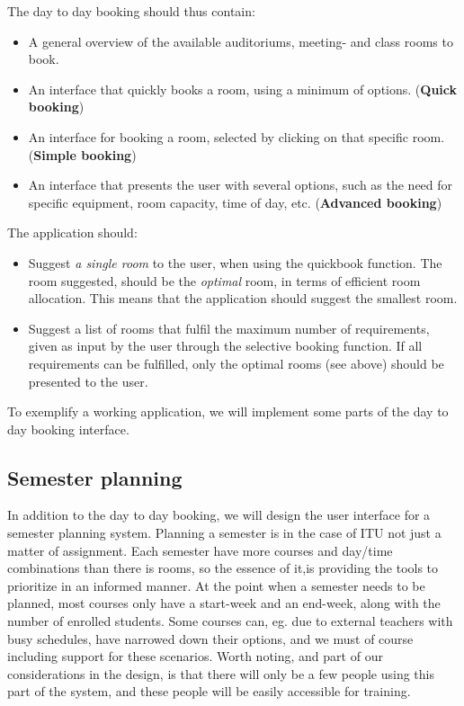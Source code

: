 The day to day booking should thus contain:

\begin{itemize}
	\item A general overview of the available auditoriums, meeting- and class rooms to book.
	\item An interface that quickly books a room, using a minimum of options. (\textbf{Quick booking})
	\item An interface for booking a room, selected by clicking on that specific room. (\textbf{Simple booking})
	\item An interface that presents the user with several options, such as the need for specific equipment, room capacity, time of day, etc. (\textbf{Advanced booking})
\end{itemize}

The application should:

\begin{itemize}
	\item Suggest \emph{a single room} to the user, when using the quickbook function. The room suggested, should be the \emph{optimal} room, in terms of efficient room allocation. This means that the application should suggest the smallest room.
	\item Suggest a list of rooms that fulfil the maximum number of requirements, given as input by the user through the selective booking function. If all requirements can be fulfilled, only the optimal rooms (see above) should be presented to the user.
\end{itemize}

To exemplify a working application, we will implement some parts of the day to day booking interface.

\subsection{Semester planning}
\label{chap1:semester_planning}
In addition to the day to day booking, we will design the user interface for a semester planning system. Planning a semester is in the case of ITU not just a matter of assignment. Each semester have more courses and day/time combinations than there is rooms, so the essence of it,is providing the tools to prioritize in an informed manner. At the point when a semester needs to be planned, most courses only have a start-week and an end-week, along with the number of enrolled students. Some courses can, eg. due to external teachers with busy schedules, have narrowed down their options, and we must of course including support for these scenarios.
Worth noting, and part of our considerations in the design, is that there will only be a few people using this part of the system, and these people will be easily accessible for training.

